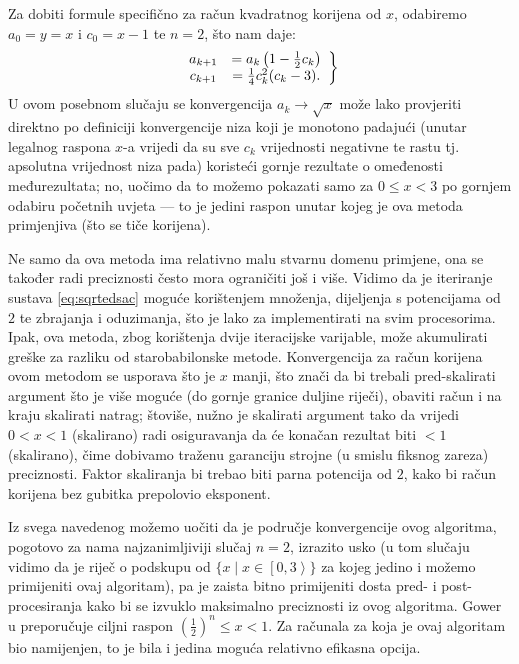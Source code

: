 \documentclass[12pt]{scrartcl}
\begin{document}
Za dobiti formule specifično za račun kvadratnog korijena od $x$, odabiremo $a_0=y=x$ i $c_0=x-1$ te $n=2$, što nam daje:
\begin{equation}
\left.
    \begin{array}{cc}
    \label{eq:sqrtedsac}
        a_{k+1} &= a_k\left(1-\frac12 c_k\right)\\
        c_{k+1} &= \frac14 c^2_k(c_k-3)\text.
\end{array}\right\}
\end{equation}
U ovom posebnom slučaju se konvergencija $a_k\to\sqrt x$ može lako provjeriti direktno po definiciji konvergencije
niza koji je monotono padajući (unutar legalnog raspona $x$-a vrijedi da su sve $c_k$ vrijednosti negativne te rastu tj.
apsolutna vrijednost niza pada) koristeći gornje rezultate o omeđenosti međurezultata; no, uočimo da to možemo pokazati
samo za $0\leq x<3$ po gornjem odabiru početnih uvjeta --- to je jedini raspon unutar kojeg je ova metoda primjenjiva (što se tiče korijena).

Ne samo da ova metoda ima relativno malu stvarnu domenu primjene, ona se također radi preciznosti često mora ograničiti još i više.
Vidimo da je iteriranje sustava \eqref{eq:sqrtedsac} moguće korištenjem množenja, dijeljenja s potencijama od $2$ te zbrajanja i oduzimanja, što
je lako za implementirati na svim procesorima. Ipak, ova metoda, zbog korištenja dvije iteracijske varijable, može akumulirati greške za razliku
od starobabilonske metode. Konvergencija za račun korijena ovom metodom se usporava što je $x$ manji, što znači da bi trebali pred-skalirati argument
što je više moguće (do gornje granice duljine riječi), obaviti račun i na kraju skalirati natrag; štoviše, nužno je
skalirati argument tako da vrijedi $0<x<1$ (skalirano) radi osiguravanja da će konačan rezultat biti $<1$ (skalirano), čime dobivamo
traženu garanciju strojne (u smislu fiksnog zareza) preciznosti. 
Faktor skaliranja bi trebao biti parna potencija od $2$,
kako bi račun korijena bez gubitka prepolovio eksponent.

Iz svega navedenog možemo uočiti da je područje konvergencije ovog algoritma, pogotovo za nama najzanimljiviji slučaj $n=2$, izrazito usko
(u tom slučaju vidimo da je riječ o podskupu od $\{x\mid x\in\left[0,3\right\rangle\}$ za kojeg jedino i možemo primijeniti ovaj algoritam), pa je
zaista bitno primijeniti dosta pred- i post-procesiranja kako bi se izvuklo maksimalno preciznosti iz ovog algoritma.
Gower u \cite{gower} preporučuje ciljni raspon $(\frac12)^n\leq x<1$.
Za računala za koja je
ovaj algoritam bio
namijenjen, to je bila i jedina moguća relativno efikasna opcija.
\end{document}
